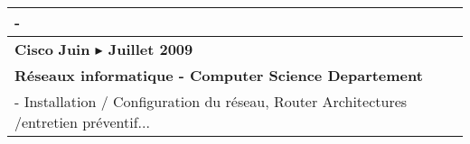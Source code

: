 \documentclass[a4paper,10pt]{article}
\begin{document}
\begin{minipage}[t]{0.45\textwidth}
\begin{table}[H]
\begin{tabular}[t]{ m{100mm}}
- \quad  \\
\hline \hline
\rowcolor{rowcolora}\textbf{Cisco} \hfill \bf{Juin $\blacktriangleright$ Juillet 2009} \\
\rowcolor{rowcolora}\bf{R\'eseaux informatique - Computer Science Departement}\\ 

- \quad Installation / Configuration du r\'eseau, Router Architectures 
/entretien pr\'eventif... \\

\end{tabular}
\hfill

\end{table}
\end{minipage}
\hspace{16mm}
\end{document}
